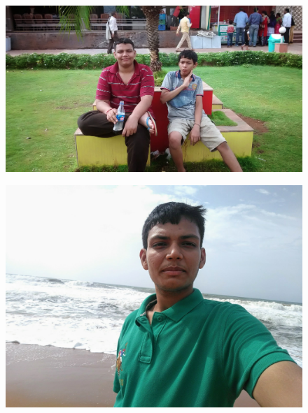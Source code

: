 \documentclass[]{article}
\begin{document}
\begin{figure}[H]
	\includegraphics[width=1\textwidth]{running/1}
\end{figure}
\begin{figure}[H]

	\includegraphics[width=1\textwidth]{running/2}
\end{figure}
\end{document}
